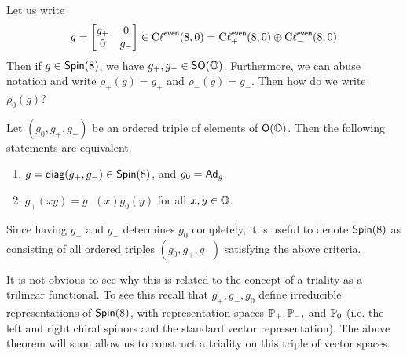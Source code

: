 \begin{remark*}
    Let us write
    \[g =\begin{bmatrix}g_+&0\\0&g_-\end{bmatrix}\in\operatorname{C\ell}^{\textsf{even}}(8,0) = \operatorname{C\ell}_+^{\textsf{even}}(8,0)\oplus \operatorname{C\ell}_-^{\textsf{even}}(8,0)\]
    Then if $g\in \operatorname{\textsf{Spin}}(8)$, we have $g_+,g_-\in\operatorname{\textsf{SO}}(\operatorname{\mathbb{O}})$. Furthermore, we can abuse notation and write $\rho_+(g)=g_+$ and $\rho_-(g)=g_-$. Then how do we write $\rho_0(g)$?
\end{remark*}
\begin{lemma}
Let $(g_0, g_+, g_-)$ be an ordered triple of elements of $\operatorname{\textsf{O}}(\operatorname{\mathbb{O}})$. Then the following statements are equivalent.
\begin{enumerate}
    \item $g=
\operatorname{\textsf{diag}}(g_+, g_-)\in \operatorname{\textsf{Spin}}(8)$, and $g_0 = \operatorname{\textsf{Ad}}_g$.
\item $g_+(xy) = g_-(x)g_0(y)$ for all $x,y \in \operatorname{\mathbb{O}}$.
\end{enumerate}
\end{lemma}
\begin{remark*}
    Since having $g_+$ and $g_-$ determines $g_0$ completely, it is useful to denote $\operatorname{\textsf{Spin}}(8)$ as consisting of all ordered triples $(g_0,g_+,g_-)$ satisfying the above criteria. 
\end{remark*}
\begin{remark*}
    It is not obvious to see why this is related to the concept of a triality as a trilinear functional. To see this recall that $g_+,g_-,g_0$ define irreducible representations of $\operatorname{\textsf{Spin}}(8)$, with representation spaces $\operatorname{\mathbb{P}}_+, \operatorname{\mathbb{P}}_-,$ and $\operatorname{\mathbb{P}}_0$ (i.e. the left and right chiral spinors and the standard vector representation). The above theorem will soon allow us to construct a triality on this triple of vector spaces.
\end{remark*}
